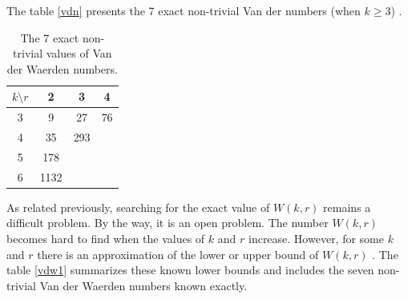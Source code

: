 
The table \eqref{vdn} presents the 7 exact non-trivial Van der numbers  (when $k\geq 3$) \citep{dransfield2004}.

\begin{table}[h]

\begin{center}
\begin{tabular}{|c|c|c|c|}
\hline 
$k \setminus r$ & 2 & 3 & 4  \\ 
\hline 
3 & 9 & 27 & 76  \\ 
\hline 
4 & 35 & 293 &   \\ 
\hline 
5 & 178 &  &   \\ 
\hline 
6 & 1132 &  &   \\ 
\hline 

\end{tabular}
\end{center}
\caption{The 7 exact non-trivial values of Van der Waerden numbers.} \label{vdn}
\end{table} 

As related previously, searching for the exact value of $W(k,r)$ remains a difficult problem.
By the way, it is an open problem. The number $W(k,r)$ becomes hard to find when the values of $k$ and $r$ increase. However, for some $k$ and $r$ there is an approximation of the lower or upper bound of $W(k,r)$ \citep{stevens1978computer, herwig2007new, beeler1979some, dransfield2004, brown2008bounds, rabung2012, kouril2008van}. The table \eqref{vdw1} summarizes these known lower bounds and includes the seven non-trivial Van der Waerden numbers known exactly.

